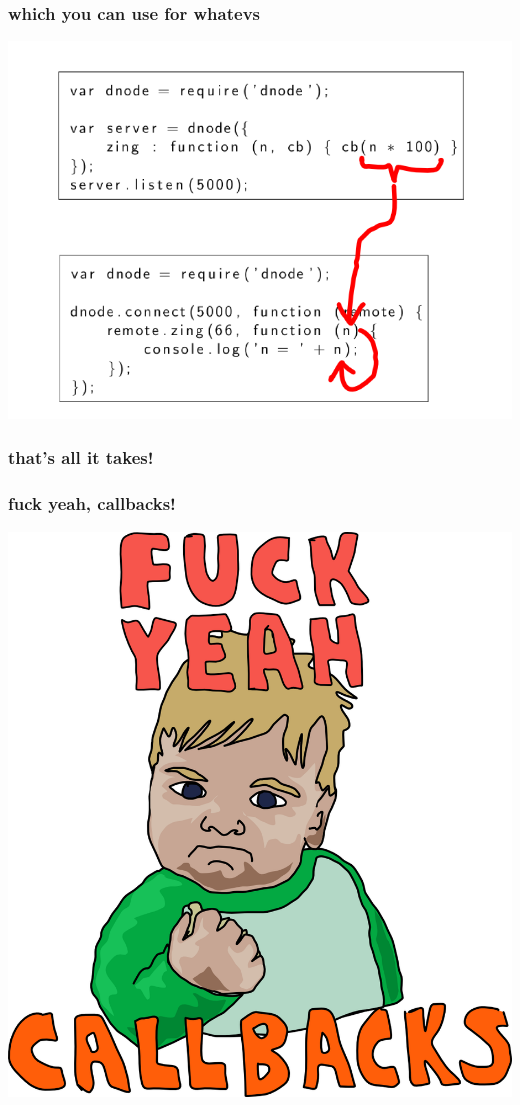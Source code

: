 \documentclass{beamer}
\begin{document}
\begin{frame}
    \frametitle{which you can use for whatevs}
    \includegraphics[scale=0.6]{images/zing_flow_6.png}
\end{frame}

\begin{frame}
    \frametitle{that's all it takes!}
    \begin{center}
        \fbox{}
    \end{center}
\end{frame}

\begin{frame}
    \frametitle{fuck yeah, callbacks!}
    \begin{center}
        \includegraphics[scale=0.5]{images/fuck_yeah.png}
    \end{center}
\end{frame}
\end{document}

